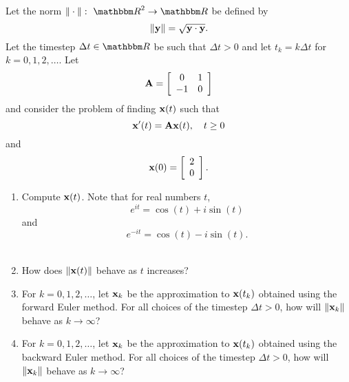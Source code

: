 Let the norm $\norm{\cdot}:\mbox{ }\R^2\rightarrow\R$ be defined by
\[
\|{\bf y}\| = \sqrt{{\bf y}\cdot {\bf y}}.
\]
Let the timestep $\Delta t\in\R$ be such that $\Delta t>0$ and let $t_k=k\Delta t$ for $k=0,1,2,\ldots$. Let
\[
{\bf A} = \left[\begin{array}{cc}0 & 1 \cr -1 & 0\end{array}\right]
\]
and consider the problem of finding ${\bf x}(t)$ such that
\[
{\bf x}'(t) = {\bf A}{\bf x}(t),\quad t\ge 0
\]
and
\[
{\bf x}(0) = \left[\begin{array}{c}2 \\ 0\end{array}\right].
\]
\begin{enumerate}
\item Compute ${\bf x}(t)$. Note that for real numbers $t$, 
\[
e^{i t} = \cos(t) + i\sin(t)
\]
and
\[
e^{-i t} = \cos(t) - i\sin(t).
\]
\\
\item How does $\|{\bf x}(t)\|$ behave as $t$ increases?
\\
\item For $k=0,1,2,\ldots$, let ${\bf x}_k$ be the approximation to ${\bf x}(t_k)$ obtained using the forward Euler method. For all choices of the timestep $\Delta t>0$, how will $\|{\bf x}_k\|$ behave as $k\rightarrow\infty$?
\\
\item For $k=0,1,2,\ldots$, let ${\bf x}_k$ be the approximation to ${\bf x}(t_k)$ obtained using the backward Euler method. For all choices of the timestep $\Delta t>0$, how will $\|{\bf x}_k\|$ behave as $k\rightarrow\infty$?
\end{enumerate}



